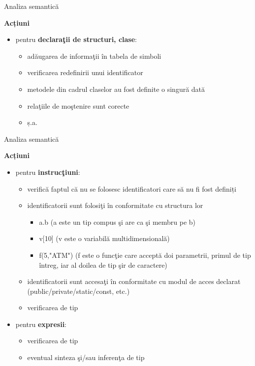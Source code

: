 \documentclass[pdf]{beamer}
\begin{document}
\begin{frame}{Analiza semantică}

\textbf{Acțiuni}

\begin{itemize}
\item
pentru \textbf{declaraţii de structuri, clase}:
\begin{itemize}
\item
adăugarea de informaţii în tabela de simboli
\item
verificarea redefinirii unui identificator
\item
metodele din cadrul claselor au fost definite o singură dată
\item
relaţiile de moştenire sunt corecte
\item
ș.a.
\end{itemize}

\end{itemize}
\end{frame}



\begin{frame}{Analiza semantică}

\textbf{Acțiuni}

\begin{itemize}
\item
pentru \textbf{instrucţiuni}:
\begin{itemize}
\item
verifică faptul că nu se folosesc identificatori care să nu fi fost definiți

\item
identificatorii sunt folosiţi în conformitate cu structura lor
\begin{itemize}
\item
a.b (a este un tip compus şi are ca şi membru pe b)
\item
v[10] (v este o variabilă multidimensională)
\item
f(5,"ATM") (f este o funcţie care acceptă doi parametrii, primul de tip întreg, iar al doilea de tip şir de caractere)
\end{itemize}

\item
identificatorii sunt accesaţi în conformitate cu modul de acces declarat (public/private/static/const, etc.)

\item
verificarea de tip
\end{itemize}

\item
pentru \textbf{expresii}:
\begin{itemize}
\item
verificarea de tip
\item
eventual sinteza şi/sau inferenţa de tip
\end{itemize}

\end{itemize}
\end{frame}
\end{document}
